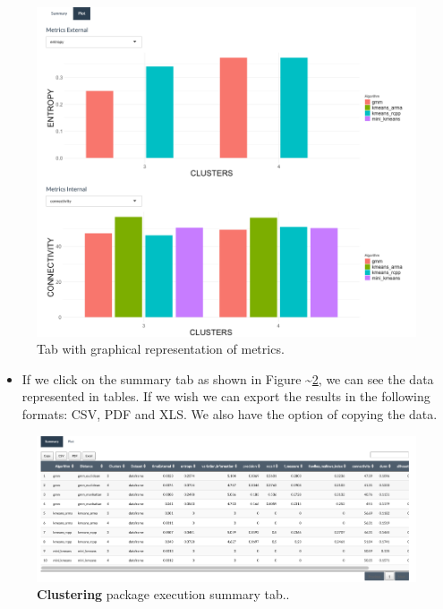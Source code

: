 \documentclass[
]{article}
\providecommand{\tightlist}{%
  \setlength{\itemsep}{0pt}\setlength{\parskip}{0pt}}
\begin{document}
\begin{figure}
\centering
\includegraphics{img/tab_graph}
\caption{Tab with graphical representation of metrics.
\label{tab_graph}}
\end{figure}

\begin{itemize}
\tightlist
\item
  If we click on the summary tab as shown in Figure
  \textasciitilde{}\ref{tab_summary}, we can see the data represented in
  tables. If we wish we can export the results in the following formats:
  CSV, PDF and XLS. We also have the option of copying the data.
\end{itemize}

\begin{figure}
\centering
\includegraphics{img/tab_summary}
\caption{\textbf{Clustering} package execution summary tab..
\label{tab_summary}}
\end{figure}

\newpage
\end{document}
